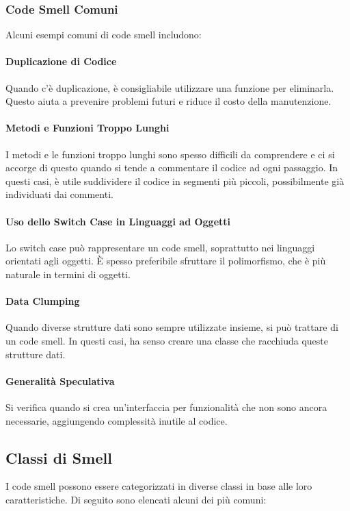 \subsubsection{Code Smell Comuni}
Alcuni esempi comuni di code smell includono:

\paragraph{Duplicazione di Codice}
Quando c'è duplicazione, è consigliabile utilizzare una funzione per
eliminarla. Questo aiuta a prevenire problemi futuri e riduce il costo
della manutenzione.

\paragraph{Metodi e Funzioni Troppo Lunghi}
I metodi e le funzioni troppo lunghi sono spesso difficili da comprendere
e ci si accorge di questo quando si tende a commentare il codice ad ogni
passaggio. In questi casi, è utile suddividere il codice in segmenti più
piccoli, possibilmente già individuati dai commenti.

\paragraph{Uso dello Switch Case in Linguaggi ad Oggetti}
Lo switch case può rappresentare un code smell, soprattutto nei linguaggi
orientati agli oggetti. È spesso preferibile sfruttare il polimorfismo, che
è più naturale in termini di oggetti.

\paragraph{Data Clumping}
Quando diverse strutture dati sono sempre utilizzate insieme, si può
trattare di un code smell. In questi casi, ha senso creare una classe che
racchiuda queste strutture dati.

\paragraph{Generalità Speculativa}
Si verifica quando si crea un'interfaccia per funzionalità che non sono
ancora necessarie, aggiungendo complessità inutile al codice.
\subsection{Classi di Smell}
I code smell possono essere categorizzati in diverse classi
in base alle loro caratteristiche. Di seguito sono elencati
alcuni dei più comuni:


